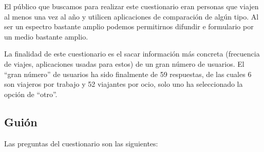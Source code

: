 El público que buscamos para realizar este cuestionario eran personas que viajen al menos una vez al año y utilicen aplicaciones de comparación de algún tipo. Al ser un espectro bastante amplio podemos permitirnos difundir e formulario por un medio bastante amplio.

La finalidad de este cuestionario es el sacar información más concreta (frecuencia de viajes, aplicaciones usadas para estos) de un gran número de usuarios. El ``gran número'' de usuarios ha sido finalmente de 59 respuestas, de las cuales 6 son viajeros por trabajo y 52 viajantes por ocio, solo uno ha seleccionado la opción de ``otro''.

\subsection{Guión}
Las preguntas del cuestionario son las siguientes:
